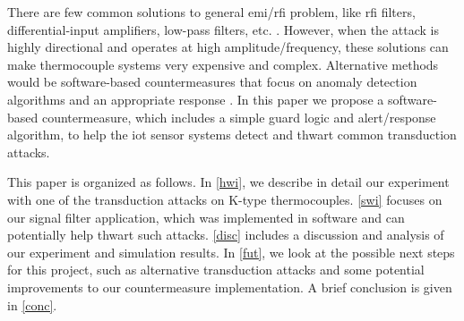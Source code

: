 There are few common solutions to general \ac{emi}/\ac{rfi} problem, like \ac{rfi} filters, differential-input amplifiers, low-pass filters, etc. \cite{Duff10}. However, when the attack is highly directional and operates at high amplitude/frequency, these solutions can make thermocouple systems very expensive and complex. Alternative methods would be software-based countermeasures that focus on anomaly detection algorithms and an appropriate response \cite{Amitai16}. In this paper we propose a software-based countermeasure, which includes a simple guard logic and alert/response algorithm, to help the \ac{iot} sensor systems detect and thwart common transduction attacks.

This paper is organized as follows. In \cref{hwi}, we describe in detail our experiment with one of the transduction attacks on K-type thermocouples. \cref{swi} focuses on our signal filter application, which was implemented in software and can potentially help thwart such attacks. \cref{disc} includes a discussion and analysis of our experiment and simulation results. In \cref{fut}, we look at the possible next steps for this project, such as alternative transduction attacks and some potential improvements to our countermeasure implementation. A brief conclusion is given in \cref{conc}.
































